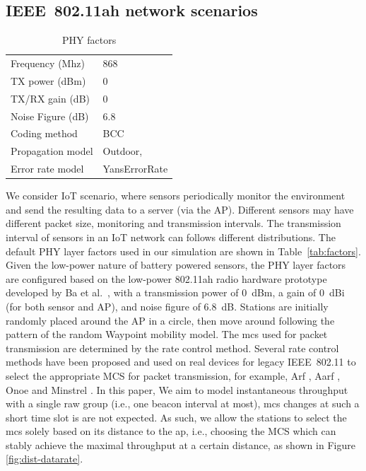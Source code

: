 \subsection{IEEE~802.11ah network scenarios}


\begin{table}[t]
\centering
\renewcommand{\arraystretch}{1.2}
\scriptsize
\caption{PHY factors \label{tab:phy factors}}
\begin{tabular}{ll}
\hline
Frequency (Mhz)                & 868 \\
TX power (dBm)                 & 0    \\
TX/RX gain (dB)                & 0     \\
Noise Figure (dB)              & 6.8      \\  
Coding method                  & BCC \\
Propagation model              & Outdoor, \cite{globecom2017} \\ %
Error rate model               & YansErrorRate \\
\hline
\end{tabular}
\end{table}


We consider IoT scenario, where sensors periodically monitor the environment and send the resulting data to a server (via the AP). Different sensors may have different packet size, monitoring and transmission intervals. The transmission interval of sensors in an IoT network can follows different distributions. The default PHY layer factors used in our simulation are shown in Table~\ref{tab:factors}. Given the low-power nature of battery powered sensors, the PHY layer factors are configured based on the low-power 802.11ah radio hardware prototype developed by Ba et al.~\cite{Ba2016}, with a transmission power of 0~dBm, a gain of 0~dBi (for both sensor and AP), and noise figure of 6.8~dB. Stations are initially randomly placed around the AP in a circle, then move around following the pattern of the random Waypoint mobility model. The \gls{mcs} used for packet transmission are determined by the rate control method. Several rate control methods have been proposed and used on real devices for legacy IEEE~802.11 to select the appropriate MCS for packet transmission, for example, Arf \cite{arf1997},  Aarf \cite{aarf2004}, Onoe \cite{Onoe} and Minstrel \cite{minstrel2013}. In this paper, We aim to model instantaneous throughput with a single \gls{raw} group (i.e., one beacon interval at most),  \gls{mcs} changes at such a short time slot is are not expected. As such, we allow the stations to select the \gls{mcs} solely based on its distance to the \gls{ap}, i.e., choosing the MCS which can stably achieve the maximal throughput at a certain distance, as shown in Figure \ref{fig:dist-datarate}. 


